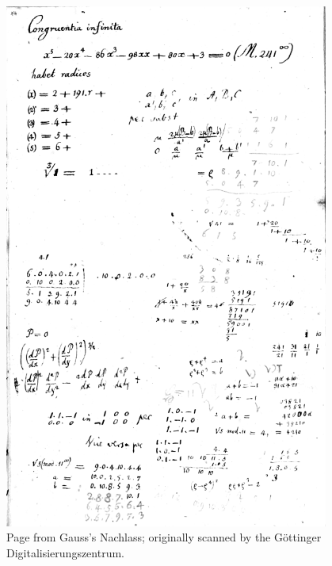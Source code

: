 \begin{figure}
\centering
\includegraphics[width=0.95\textwidth]{nachlass-BW.pdf}
\caption*{Page from Gauss's Nachlass; originally scanned by the Göttinger Digitalisierungszentrum.}
\end{figure}

